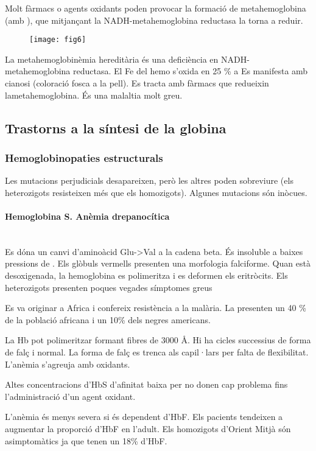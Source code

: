 Molt fàrmacs o agents oxidants poden provocar la formació de
metahemoglobina (amb ), que mitjançant la NADH-metahemoglobina
reductasa la torna a reduir.

\begin{figure}[H]
  \centering
  \texttt{[image: fig6]}
\end{figure}

La metahemoglobinèmia hereditària és una deficiència en NADH-metahemoglobina
reductasa. El Fe del hemo s'oxida en 25 \% a  Es manifesta amb
cianosi (coloració fosca a la pell). Es tracta amb fàrmacs que
redueixin lametahemoglobina. És una malaltia
molt greu.

\subsection{Trastorns a la síntesi de la globina}
\subsubsection{Hemoglobinopaties estructurals}
Les mutacions perjudicials desapareixen, però les altres poden sobreviure
(els heterozigots resisteixen més que els homozigots). Algunes
mutacions són inòcues.

\paragraph{Hemoglobina S. Anèmia drepanocítica} \hfill \\
Es dóna un canvi d'aminoàcid Glu->Val a la cadena beta. És insoluble a baixes pressions
de . Els glòbuls vermells presenten una morfologia
falciforme. Quan està desoxigenada, la hemoglobina es polimeritza i es
deformen els eritròcits. Els heterozigots  presenten poques vegades símptomes greus

Es va originar a Africa i confereix resistència a la malària. La
presenten un 40 \% de la població africana i un 10\% dels negres
americans.

La Hb pot polimeritzar formant fibres de 3000 \AA{}. Hi ha cicles
successius de forma de falç i normal. La forma de falç es trenca als
capil·lars per falta de flexibilitat. L'anèmia s'agreuja amb oxidants.

Altes concentracions d'HbS d'afinitat baixa per  no donen cap
problema fins l'administració d'un agent oxidant.

L'anèmia és menys severa si és dependent d'HbF. Els pacients tendeixen
a augmentar la proporció d'HbF en l'adult. Els homozigots d'Orient
Mitjà són asimptomàtics ja que tenen un 18\% d'HbF.

